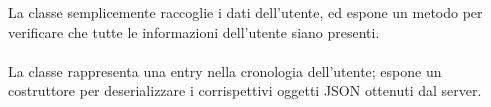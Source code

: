 \documentclass[../../manuale-manutentore.tex]{subfiles}
\begin{document}
La classe  semplicemente raccoglie i dati dell'utente, ed espone un metodo per verificare che tutte le informazioni dell'utente siano presenti.

\paragraph[UserOrganizationHistory]{}%
\label{par:userorganizationhistory}

La classe  rappresenta una entry nella cronologia dell'utente; espone un costruttore per deserializzare i corrispettivi oggetti JSON ottenuti dal server.

\end{document}

